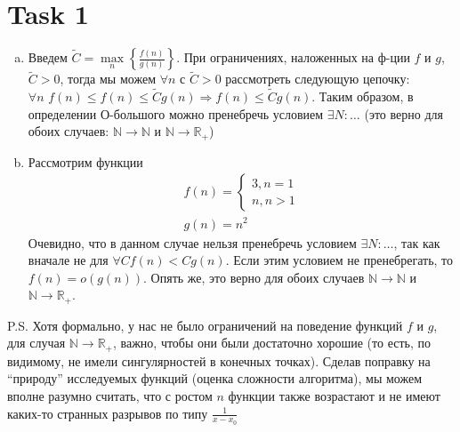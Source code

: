 \section{Task 1}
\begin{enumerate}[(a)]
    \item Введем $\widetilde{C} = \max\limits_{n}\left\{\frac{f(n)}{g(n)}\right\}$. При ограничениях, наложенных на ф-ции $f$ и $g$, $\widetilde{C} > 0$, тогда мы можем $\forall n$ с $\widetilde{C} > 0$ рассмотреть следующую цепочку: $\forall n \,\, f(n) \leq f(n) \leq \widetilde{C}g(n) \Longrightarrow f(n) \leq \widetilde{C}g(n)$. Таким образом, в определении О-большого можно пренебречь условием $\exists N:\ldots$ (это верно для обоих случаев: $\mathds{N} \to \mathds{N}$ и $\mathds{N}\to\mathds{R}_+$)
    \item Рассмотрим функции
    \begin{gather}
        f(n) = 
        \begin{cases}
            3, n = 1 \\
            n, n > 1    
        \end{cases} \\
        g(n) = n^2
    \end{gather}
    Очевидно, что в данном случае нельзя пренебречь условием $\exists N:\ldots$, так как вначале не для $\forall C f(n) < Cg(n)$. Если этим условием не пренебрегать, то $f(n) = o(g(n))$. Опять же, это верно для обоих случаев $\mathds{N} \to \mathds{N}$ и $\mathds{N}\to\mathds{R}_+$.
\end{enumerate}
P.S. Хотя формально, у нас не было ограничений на поведение функций $f$ и $g$, для случая $\mathds{N}\to\mathds{R}_+$, важно, чтобы они были достаточно хорошие (то есть, по видимому, не имели сингулярностей в конечных точках). Сделав поправку на ``природу'' исследуемых функций (оценка сложности алгоритма), мы можем вполне разумно считать, что с ростом $n$ функции также возрастают и не имеют каких-то странных разрывов по типу $\frac{1}{x - x_0}$